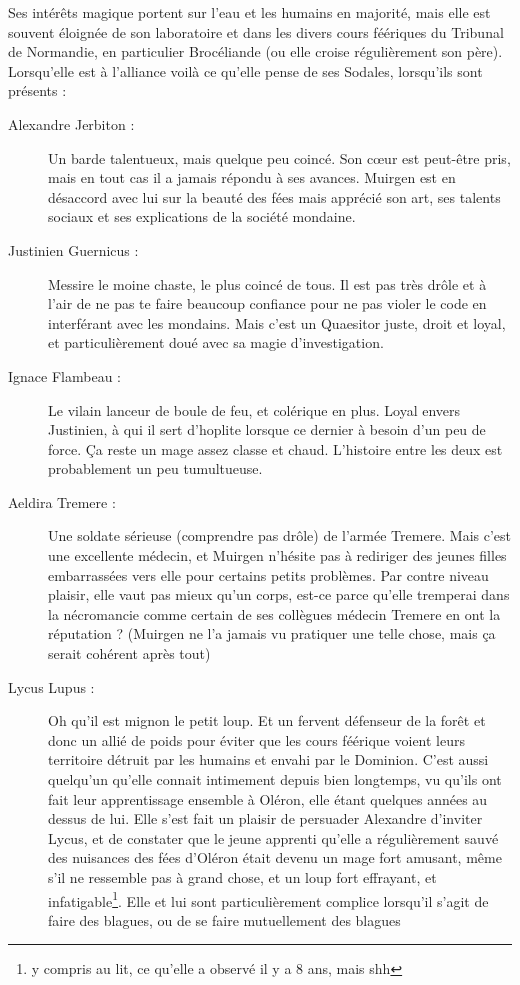 Ses intérêts magique portent sur l'eau et les humains en majorité, mais elle est souvent éloignée de son laboratoire et dans les divers cours féériques du Tribunal de Normandie, en particulier Brocéliande (ou elle croise régulièrement son père). Lorsqu'elle est à l'alliance voilà ce qu'elle pense de ses Sodales, lorsqu'ils sont présents :
\begin{description}
\item[Alexandre Jerbiton :] Un barde talentueux, mais quelque peu coincé. Son cœur est peut-être pris, mais en tout cas il a jamais répondu à ses avances. Muirgen est en désaccord avec lui sur la beauté des fées mais apprécié son art, ses talents sociaux et ses explications de la société mondaine.

\item[Justinien Guernicus :] Messire le moine chaste, le plus coincé de tous. Il est pas très drôle et à l'air de ne pas te faire beaucoup confiance pour ne pas violer le code en interférant avec les mondains.
Mais c'est un Quaesitor juste, droit et loyal, et particulièrement doué avec sa magie d'investigation.

\item[Ignace Flambeau :] Le vilain lanceur de boule de feu, et colérique en plus. Loyal envers Justinien, à qui il sert d'hoplite lorsque ce dernier à besoin d'un peu de force. Ça reste un mage assez classe et chaud. L'histoire entre les deux est probablement un peu tumultueuse.

\item[Aeldira Tremere :] Une soldate sérieuse (comprendre pas drôle) de l'armée Tremere. Mais c'est une excellente médecin, et Muirgen n'hésite pas à rediriger des jeunes filles embarrassées vers elle pour certains petits problèmes. Par contre niveau plaisir, elle vaut pas mieux qu'un corps, est-ce parce qu'elle tremperai dans la nécromancie comme certain de ses collègues médecin Tremere en ont la réputation ? (Muirgen ne l'a jamais vu pratiquer une telle chose, mais ça serait cohérent après tout)

\item[Lycus Lupus :] Oh qu'il est mignon le petit loup. Et un fervent défenseur de la forêt et donc un allié de poids pour éviter que les cours féérique voient leurs territoire détruit par les humains et envahi par le Dominion. C'est aussi quelqu'un qu'elle connait intimement depuis bien longtemps, vu qu'ils ont fait leur apprentissage ensemble à Oléron, elle étant quelques années au dessus de lui. Elle s'est fait un plaisir de persuader Alexandre d'inviter Lycus, et de constater que le jeune apprenti qu'elle a régulièrement sauvé des nuisances des fées d'Oléron était devenu un mage fort amusant, même s'il ne ressemble pas à grand chose, et un loup fort effrayant, et infatigable\footnote{y compris au lit, ce qu'elle a observé il y a 8 ans, mais shh}. Elle et lui sont particulièrement complice lorsqu'il s'agit de faire des blagues, ou de se faire mutuellement des blagues


\end{description}
